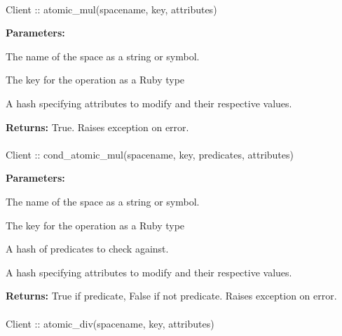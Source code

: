 \paragraph{}
\label{api:ruby:atomic_mul}
\begin{rubycode}
Client :: atomic_mul(spacename, key, attributes)
\end{rubycode}


\noindent\textbf{Parameters:}
\begin{description}[labelindent=\widthof{{\code{attributes}}},leftmargin=*,noitemsep,nolistsep,align=right]
\item[\code{spacename}] The name of the space as a string or symbol.
\item[\code{key}] The key for the operation as a Ruby type
\item[\code{attributes}] A hash specifying attributes to modify and their respective values.
\end{description}

\noindent\textbf{Returns:}
True.  Raises exception on error.

\paragraph{}
\label{api:ruby:cond_atomic_mul}
\begin{rubycode}
Client :: cond_atomic_mul(spacename, key, predicates, attributes)
\end{rubycode}


\noindent\textbf{Parameters:}
\begin{description}[labelindent=\widthof{{\code{predicates}}},leftmargin=*,noitemsep,nolistsep,align=right]
\item[\code{spacename}] The name of the space as a string or symbol.
\item[\code{key}] The key for the operation as a Ruby type
\item[\code{predicates}] A hash of predicates to check against.
\item[\code{attributes}] A hash specifying attributes to modify and their respective values.
\end{description}

\noindent\textbf{Returns:}
True if predicate, False if not predicate.  Raises exception on error.

\paragraph{}
\label{api:ruby:atomic_div}
\begin{rubycode}
Client :: atomic_div(spacename, key, attributes)
\end{rubycode}


